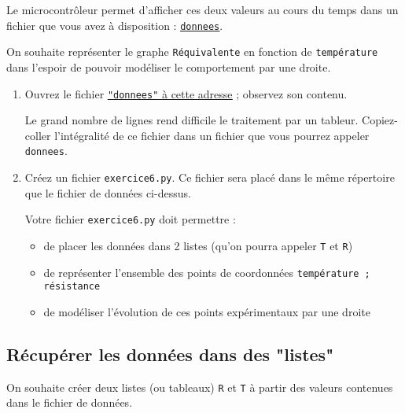 \documentclass[11pt]{article}
\begin{document}
\medskip

Le microcontrôleur permet d'afficher ces deux valeurs au cours du temps dans un fichier que vous avez à disposition : \href{https://github.com/formationPythonPC-Juin/enonce-donnees/blob/master/donnees}{\underline{\texttt{donnees}}}.

\medskip

On souhaite représenter le graphe \texttt{Réquivalente} en fonction de \texttt{température} dans l'espoir de pouvoir modéliser le comportement par une droite. 


\medskip


\begin{enumerate}
 \item Ouvrez le fichier  \href{https://github.com/formationPythonPC-Juin/enonce-donnees/blob/master/donnees}{\underline{\texttt{"donnees"} à cette adresse}} ; observez son contenu. 
 
 \smallskip
 Le grand nombre de lignes rend difficile le traitement par un tableur. Copiez-coller l'intégralité de ce fichier dans un fichier que vous pourrez appeler \texttt{donnees}.
 \item Créez un fichier \texttt{exercice6.py}. Ce fichier sera placé dans le même répertoire que le fichier de données ci-dessus. 
 
 \smallskip
 Votre fichier \texttt{exercice6.py} doit permettre :
 
 
 \begin{itemize}
  \item de placer les données dans 2 listes (qu'on pourra appeler \texttt{T} et \texttt{R})
  \item de représenter l'ensemble des points de coordonnées \texttt{température ; résistance}
  \item de modéliser l'évolution de ces points expérimentaux par une droite
 \end{itemize}

\end{enumerate}



\subsection{Récupérer les données dans des "listes"}


On souhaite créer deux listes (ou tableaux) \texttt{R} et \texttt{T} à partir des valeurs contenues dans le fichier de données.

\smallskip
\end{document}
